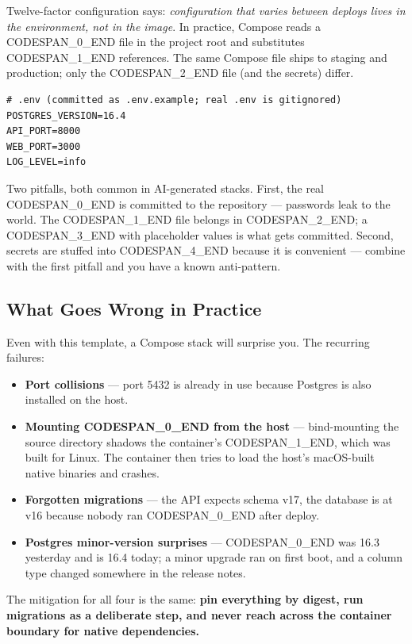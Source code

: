 \documentclass[11pt,a4paper]{book}
\begin{document}
Twelve-factor configuration says: \textit{configuration that varies between deploys lives in the environment, not in the image}. In practice, Compose reads a CODESPAN\_0\_END file in the project root and substitutes CODESPAN\_1\_END references. The same Compose file ships to staging and production; only the CODESPAN\_2\_END file (and the secrets) differ.

\begin{lstlisting}
# .env (committed as .env.example; real .env is gitignored)
POSTGRES_VERSION=16.4
API_PORT=8000
WEB_PORT=3000
LOG_LEVEL=info
\end{lstlisting}

Two pitfalls, both common in AI-generated stacks. First, the real CODESPAN\_0\_END is committed to the repository --- passwords leak to the world. The CODESPAN\_1\_END file belongs in CODESPAN\_2\_END; a CODESPAN\_3\_END with placeholder values is what gets committed. Second, secrets are stuffed into CODESPAN\_4\_END because it is convenient --- combine with the first pitfall and you have a known anti-pattern.

\subsection{What Goes Wrong in Practice}

Even with this template, a Compose stack will surprise you. The recurring failures:

\begin{itemize}
  \item \textbf{Port collisions} --- port 5432 is already in use because Postgres is also installed on the host.
  \item \textbf{Mounting CODESPAN\_0\_END from the host} --- bind-mounting the source directory shadows the container's CODESPAN\_1\_END, which was built for Linux. The container then tries to load the host's macOS-built native binaries and crashes.
  \item \textbf{Forgotten migrations} --- the API expects schema v17, the database is at v16 because nobody ran CODESPAN\_0\_END after deploy.
  \item \textbf{Postgres minor-version surprises} --- CODESPAN\_0\_END was 16.3 yesterday and is 16.4 today; a minor upgrade ran on first boot, and a column type changed somewhere in the release notes.
\end{itemize}

The mitigation for all four is the same: \textbf{pin everything by digest, run migrations as a deliberate step, and never reach across the container boundary for native dependencies.}
\end{document}
